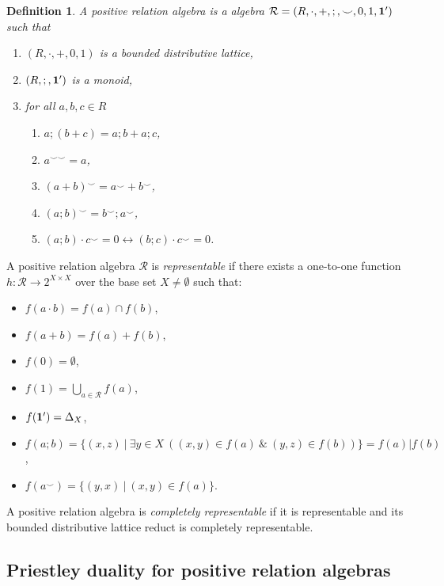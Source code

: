 \documentclass[a4paper]{article}
\theoremstyle{defin}
\newtheorem{definition}{Definition}
\theoremstyle{theorem}
\theoremstyle{claim}
\theoremstyle{prop}
\theoremstyle{lemma}
\theoremstyle{fact}
\theoremstyle{ex}
\theoremstyle{col}
\begin{document}
\begin{definition}

A positive relation algebra is a algebra $\mathcal{R} = (R, \cdot, +, ;, \smile, 0, 1, {\bf 1}')$ such that
\begin{enumerate}
\item $(R, \cdot, +, 0, 1)$ is a bounded distributive lattice,
\item $(R, ;, {\bf 1}')$ is a monoid,
\item for all $a, b, c \in R$
\begin{enumerate}
\item $a ; (b + c) = a ; b + a ; c$,
\item $a^{\smile \smile} = a$,
\item $(a + b)^{\smile} = a^{\smile} + b^{\smile}$,
\item $(a ; b)^{\smile} = b^{\smile} ; a^{\smile}$,
\item $(a ; b) \cdot c^{\smile} = 0 \leftrightarrow (b ; c) \cdot c^{\smile} = 0$.
\end{enumerate}
\end{enumerate}
\end{definition}

A positive relation algebra $\mathcal{R}$ is \emph{representable} if there exists a one-to-one function $h : \mathcal{R} \to 2^{X \times X}$ over the base set $X \neq \emptyset$ such that:
\begin{itemize}
\item $f(a \cdot b) = f(a) \cap f(b)$,
\item $f(a + b) = f(a) + f(b)$,
\item $f(0) = \emptyset$,
\item $f(1) = \bigcup \limits_{a \in \mathcal{R}} f(a)$,
\item $f({\bf 1}') = \Delta_X$,
\item $f(a ; b) = \{ (x, z) \: | \: \exists y \in X \: ((x, y) \in f(a) \: \& \: (y,z) \in f(b))\} = f(a) | f(b)$,
\item $f(a^{\smile}) = \{ (y, x) \: | \: (x, y) \in f(a) \}$.
\end{itemize}

A positive relation algebra is \emph{completely representable} if it is representable and its bounded distributive lattice reduct is completely representable.

\subsection{Priestley duality for positive relation algebras}
\end{document}
